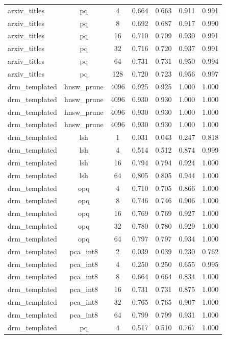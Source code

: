 \begin{longtable}{lcccccc}
arxiv\_titles & pq & 4 & 0.664 & 0.663 & 0.911 & 0.991 \\
arxiv\_titles & pq & 8 & 0.692 & 0.687 & 0.917 & 0.990 \\
arxiv\_titles & pq & 16 & 0.710 & 0.709 & 0.930 & 0.991 \\
arxiv\_titles & pq & 32 & 0.716 & 0.720 & 0.937 & 0.991 \\
arxiv\_titles & pq & 64 & 0.731 & 0.731 & 0.950 & 0.994 \\
arxiv\_titles & pq & 128 & 0.720 & 0.723 & 0.956 & 0.997 \\
drm\_templated & hnsw\_prune & 4096 & 0.925 & 0.925 & 1.000 & 1.000 \\
drm\_templated & hnsw\_prune & 4096 & 0.930 & 0.930 & 1.000 & 1.000 \\
drm\_templated & hnsw\_prune & 4096 & 0.930 & 0.930 & 1.000 & 1.000 \\
drm\_templated & hnsw\_prune & 4096 & 0.930 & 0.930 & 1.000 & 1.000 \\
drm\_templated & lsh & 1 & 0.031 & 0.043 & 0.247 & 0.818 \\
drm\_templated & lsh & 4 & 0.514 & 0.512 & 0.874 & 0.999 \\
drm\_templated & lsh & 16 & 0.794 & 0.794 & 0.924 & 1.000 \\
drm\_templated & lsh & 64 & 0.805 & 0.805 & 0.944 & 1.000 \\
drm\_templated & opq & 4 & 0.710 & 0.705 & 0.866 & 1.000 \\
drm\_templated & opq & 8 & 0.746 & 0.746 & 0.906 & 1.000 \\
drm\_templated & opq & 16 & 0.769 & 0.769 & 0.927 & 1.000 \\
drm\_templated & opq & 32 & 0.780 & 0.780 & 0.929 & 1.000 \\
drm\_templated & opq & 64 & 0.797 & 0.797 & 0.934 & 1.000 \\
drm\_templated & pca\_int8 & 2 & 0.039 & 0.039 & 0.230 & 0.762 \\
drm\_templated & pca\_int8 & 4 & 0.250 & 0.250 & 0.655 & 0.995 \\
drm\_templated & pca\_int8 & 8 & 0.664 & 0.664 & 0.834 & 1.000 \\
drm\_templated & pca\_int8 & 16 & 0.731 & 0.731 & 0.875 & 1.000 \\
drm\_templated & pca\_int8 & 32 & 0.765 & 0.765 & 0.907 & 1.000 \\
drm\_templated & pca\_int8 & 64 & 0.799 & 0.799 & 0.931 & 1.000 \\
drm\_templated & pq & 4 & 0.517 & 0.510 & 0.767 & 1.000 \\

\end{longtable}
